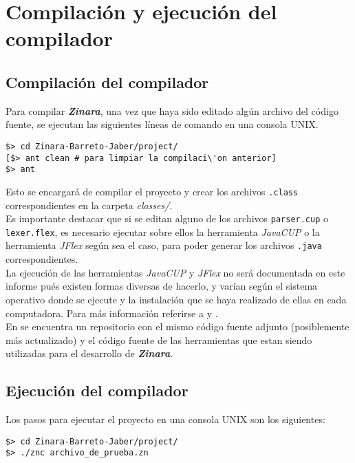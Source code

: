 \documentclass[12pt, spanish]{report}
\begin{document}
\chapter{Compilaci\'on y ejecuci\'on del compilador}
\section{Compilaci\'on del compilador}
\label{sec:compilacion}
Para compilar \emph{\textbf{Zinara}}, una vez que haya sido editado
alg\'un archivo del c\'odigo fuente, se ejecutan las siguientes l\'ineas de
comando en una consola UNIX.

\begin{verbatim}
$> cd Zinara-Barreto-Jaber/project/
[$> ant clean # para limpiar la compilaci\'on anterior]
$> ant
\end{verbatim}

Esto se encargar\'a de compilar el proyecto y crear los archivos
\texttt{.class} correspondientes en la carpeta \emph{classes/}.\\

Es importante destacar que si se editan alguno de los archivos
\texttt{parser.cup} o \texttt{lexer.flex}, es necesario ejecutar sobre
ellos la herramienta \emph{JavaCUP} o la herramienta \emph{JFlex}
según sea el caso, para poder generar los archivos \texttt{.java}
correspondientes.\\

La ejecuci\'on de las herramientas \emph{JavaCUP} y \emph{JFlex} no ser\'a
documentada en este informe pu\'es existen formas diversas de hacerlo, y
var\'ian seg\'un el sistema operativo donde se ejecute y la instalaci\'on
que se haya realizado de ellas en cada computadora. Para m\'as
informaci\'on referirse a \cite{javacup} y \cite{jflex}.\\

En \cite{github} se encuentra un repositorio con el mismo c\'odigo
fuente adjunto (posiblemente m\'as actualizado) y el c\'odigo fuente de
las herramientas que estan siendo utilizadas para el desarrollo de
\emph{\textbf{Zinara}}.

\section{Ejecuci\'on del compilador}
\label{sec:zejecucion}
Los pasos para ejecutar el proyecto en una consola UNIX son los
siguientes:

\begin{verbatim}
$> cd Zinara-Barreto-Jaber/project/
$> ./znc archivo_de_prueba.zn
\end{verbatim}
\end{document}
